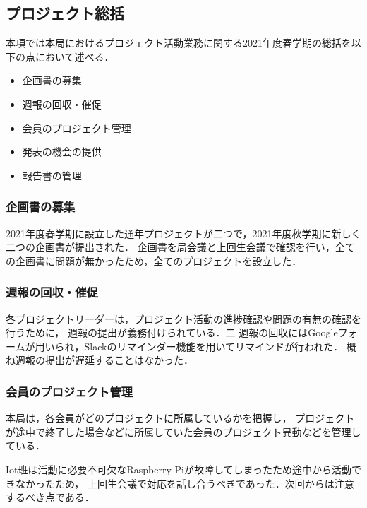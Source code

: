 \subsection*{プロジェクト総括}


本項では本局におけるプロジェクト活動業務に関する2021年度春学期の総括を以下の点において述べる．

\begin{itemize}
  \item 企画書の募集
  \item 週報の回収・催促
  \item 会員のプロジェクト管理
  \item 発表の機会の提供
  \item 報告書の管理
\end{itemize}

\subsubsection*{企画書の募集}

2021年度春学期に設立した通年プロジェクトが二つで，2021年度秋学期に新しく二つの企画書が提出された．
企画書を局会議と上回生会議で確認を行い，全ての企画書に問題が無かったため，全てのプロジェクトを設立した．

\subsubsection*{週報の回収・催促}

各プロジェクトリーダーは，プロジェクト活動の進捗確認や問題の有無の確認を行うために，
週報の提出が義務付けられている．二
週報の回収にはGoogleフォームが用いられ，Slackのリマインダー機能を用いてリマインドが行われた．
概ね週報の提出が遅延することはなかった．

\subsubsection*{会員のプロジェクト管理}

本局は，各会員がどのプロジェクトに所属しているかを把握し，
プロジェクトが途中で終了した場合などに所属していた会員のプロジェクト異動などを管理している．

Iot班は活動に必要不可欠なRaspberry Piが故障してしまったため途中から活動できなかったため，
上回生会議で対応を話し合うべきであった．次回からは注意するべき点である．

